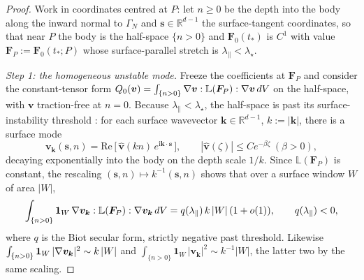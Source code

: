 \begin{proof}
    Work in coordinates centred at $P$: let $n\ge0$ be the depth into the body along the inward normal to $\Gamma_N$ and
    $\bm{s}\in\mathbb{R}^{d-1}$ the surface-tangent coordinates, so that near $P$ the body is the half-space $\{n>0\}$ and
    $\bm{F}_0(t_*)$ is $C^1$ with value $\bm{F}_P:=\bm{F}_0(t_*;P)$ whose surface-parallel stretch is
    $\lambda_\parallel<\lambda_\star$.

    \emph{Step 1: the homogeneous unstable mode.} Freeze the coefficients at $\bm{F}_P$ and consider the constant-tensor
    form $Q_0(\bm{v})=\int_{\{n>0\}}\nabla\bm{v}:\mathbb{L}(\bm{F}_P):\nabla\bm{v}\,dV$ on the half-space, with $\bm{v}$
    traction-free at $n=0$. Because $\lambda_\parallel<\lambda_\star$, the half-space is past its surface-instability
    threshold \cite{Biot1963,Hong2009}: for each surface wavevector
    $\bm{k}\in\mathbb{R}^{d-1}$, $k:=|\bm{k}|$, there is a
    surface mode
    \begin{equation}
        \label{eq:biotmode}
        \bm{v}_{\bm{k}}(\bm{s},n) = \mathrm{Re}\,\big[\,\hat{\bm{v}}(kn)\,e^{\mathrm{i}\bm{k}\cdot\bm{s}}\,\big],
        \qquad |\hat{\bm{v}}(\zeta)|\le C e^{-\beta\zeta}\ (\beta>0),
    \end{equation}
    decaying exponentially into the body on the depth scale $1/k$. Since $\mathbb{L}(\bm{F}_P)$ is constant, the rescaling
    $(\bm{s},n)\mapsto k^{-1}(\bm{s},n)$ shows that over a surface window $W$ of area $|W|$,
    \begin{equation}
        \label{eq:biotscale}
        \int_{\{n>0\}} \mathbf{1}_W\,\nabla\bm{v}_{\bm{k}}:\mathbb{L}(\bm{F}_P):\nabla\bm{v}_{\bm{k}}\,dV
        = q(\lambda_\parallel)\,k\,|W|\,(1+o(1)), \qquad q(\lambda_\parallel)<0,
    \end{equation}
    where $q$ is the Biot secular form, strictly negative past threshold. Likewise
    $\int_{\{n>0\}}\mathbf{1}_W\,|\nabla\bm{v}_{\bm{k}}|^2 \sim k\,|W|$ and
    $\int_{\{n>0\}}\mathbf{1}_W\,|\bm{v}_{\bm{k}}|^2 \sim k^{-1}|W|$, the latter two by the same scaling.


\end{proof}
